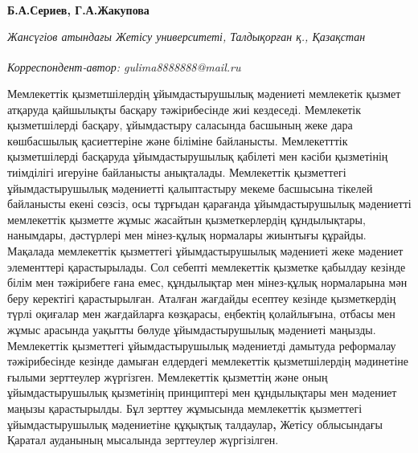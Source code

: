 
\begin{articleheader}

{\bfseries
Б.А.Сериев,
Г.А.Жакупова\textsuperscript{\envelope } }
\end{articleheader}

\begin{affiliation}
\emph{Жансүгіов атындағы Жетісу университеті, Талдықорған қ., Қазақстан}

\raggedright \textsuperscript{\envelope }{\em Корреспондент-автор: gulima8888888@mail.ru}
\end{affiliation}

Мемлекеттік қызметшілердің ұйымдастырушылық мәдениеті мемлекетік қызмет
атқаруда қайшылықты басқару тәжірибесінде жиі кездеседі. Мемлекетік
қызметшілерді басқару, ұйымдастыру саласында басшының жеке дара
көшбасшылық қасиеттеріне және біліміне байланысты. Мемлекетттік
қызметшілерді басқаруда ұйымдастырушылық қабілеті мен кәсіби қызметінің
тиімділігі игеруіне байланысты анықталады. Мемлекеттік қызметтегі
ұйымдастырушылық мәдениетті қалыптастыру мекеме басшысына тікелей
байланысты екені сөзсіз, осы тұрғыдан қарағанда ұйымдастырушылық
мәдениетті мемлекеттік қызметте жұмыс жасайтын қызметкерлердің
құндылықтары, нанымдары, дәстүрлері мен мінез-құлық нормалары жиынтығы
құрайды. Мақалада мемлекеттік қызметтегі ұйымдастырушылық мәдениеті жеке
мәдениет элементтері қарастырылады. Сол себепті мемлекеттік қызметке
қабылдау кезінде білім мен тәжірибеге ғана емес, құндылықтар мен
мінез-құлық нормаларына мән беру керектігі қарастырылған. Аталған
жағдайды есептеу кезінде қызметкердің түрлі оқиғалар мен жағдайларға
көзқарасы, еңбектің қолайлығына, отбасы мен жұмыс арасында уақытты
бөлуде ұйымдастырушылық мәдениеті маңызды. Мемлекеттік қызметтегі
ұйымдастырушылық мәдениетді дамытуда реформалау тәжірибесінде кезінде
дамыған елдердегі мемлекеттік қызметшілердің мәдинетіне ғылыми
зерттеулер жүргізген. Мемлекеттік қызметтің және оның ұйымдастырушылық
қызметінің принциптері мен құндылықтары мен мәдениет маңызы
қарастырылды. Бұл зерттеу жұмысында мемлекеттік қызметтегі
ұйымдастырушылық мәдениетіне құқықтық талдаулар{\bfseries ,} Жетісу
облысындағы Қаратал ауданының мысалында зерттеулер жүргізілген.

